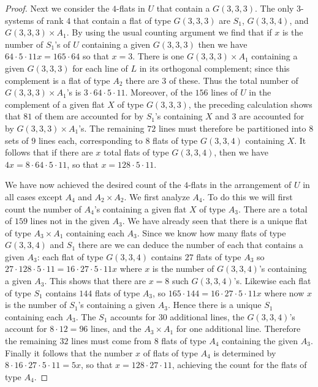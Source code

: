 \documentclass[11pt, reqno]{amsart}
\numberwithin{equation}{section}
\theoremstyle{definition}
\theoremstyle{plain}
\begin{document}
\begin{proof}
Next we consider the $4$-flats in $U$ that contain a $G(3,3,3)$. The only $3$-systems of rank $4$ that contain a flat of type $G(3,3,3)$ are $S_1$, $G(3,3,4)$, and $G(3,3,3) \times A_1$. By using the usual counting argument we find that if $x$ is the number of $S_1$'s of $U$ containing a given $G(3,3,3)$ then we have $64 \cdot 5 \cdot 11 x=165 \cdot 64$ so that $x=3$. There is one $G(3,3,3) \times A_1$ containing a given $G(3,3,3)$ for each line of $L$ in its orthogonal complement; since this complement is a flat of type $A_2$ there are $3$ of these. Thus the total number of $G(3,3,3) \times A_1$'s is $3 \cdot 64 \cdot 5 \cdot 11$. Moreover, of the $156$ lines of $U$ in the complement of a given flat $X$ of type $G(3,3,3)$, the preceding calculation shows that $81$ of them are accounted for by $S_1$'s containing $X$ and $3$ are accounted for by $G(3,3,3) \times A_1$'s. The remaining $72$ lines must therefore be partitioned into $8$ sets of $9$ lines each, corresponding to $8$ flats of type $G(3,3,4)$ containing $X$. It follows that if there are $x$ total flats of type $G(3,3,4)$, then we have $4x=8 \cdot 64 \cdot 5 \cdot 11$, so that $x=128 \cdot 5 \cdot 11$. 

We have now achieved the desired count of the $4$-flats in the arrangement of $U$ in all cases except $A_4$ and $A_2 \times A_2$. We first analyze $A_4$. To do this we will first count the number of $A_4$'s containing a given flat $X$ of type $A_3$. There are a total of $159$ lines not in the given $A_3$. We have already seen that there is a unique flat of type $A_3 \times A_1$ containing each $A_3$. Since we know how many flats of type $G(3,3,4)$ and $S_1$ there are we can deduce the number of each that contains a given $A_3$: each flat of type $G(3,3,4)$ contains $27$ flats of type $A_3$ so $27 \cdot 128 \cdot 5 \cdot 11=16 \cdot 27 \cdot 5 \cdot 11 x$ where $x$ is the number of $G(3,3,4)$'s containing a given $A_3$. This shows that there are $x=8$ such $G(3,3,4)$'s. Likewise each flat of type $S_1$ contains $144$ flats of type $A_3$, so $165 \cdot 144=16 \cdot 27 \cdot 5 \cdot 11 x$ where now $x$ is the number of $S_1$'s containing a given $A_3$. Hence there is a unique $S_1$ containing each $A_3$. The $S_1$ accounts for $30$ additional lines, the $G(3,3,4)$'s account for $8 \cdot 12=96$ lines, and the $A_3 \times A_1$ for one additional line. Therefore the remaining $32$ lines must come from $8$ flats of type $A_4$ containing the given $A_3$. Finally it follows that the number $x$ of flats of type $A_4$ is determined by $8 \cdot 16 \cdot 27 \cdot 5 \cdot 11=5x$, so that $x=128 \cdot 27 \cdot 11$, achieving the count for the flats of type $A_4$. 


\end{proof}
\end{document}
